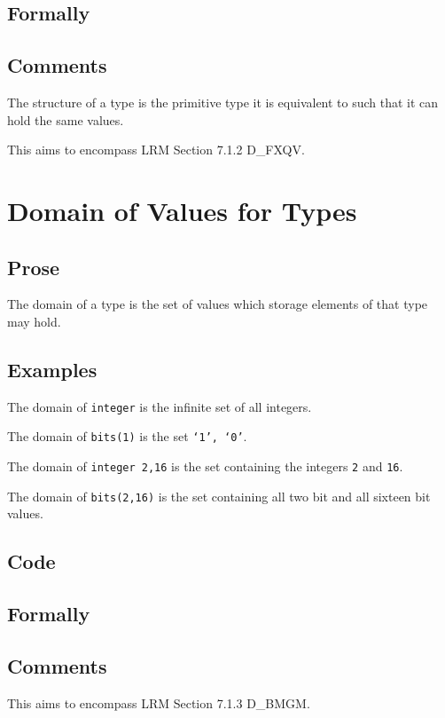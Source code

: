 \documentclass{book}
\begin{document}
    \subsection{Formally}

    \subsection{Comments}
    The structure of a type is the primitive type it is equivalent to such that
    it can hold the same values. 

    This aims to encompass LRM Section 7.1.2 D\_FXQV.

\section{Domain of Values for Types}

\subsection{Prose}
  The domain of a type is the set of values which storage elements of that type
may hold. 

\subsection{Examples}
  The domain of \texttt{integer} is the infinite set of all integers.

  The domain of \texttt{bits(1)} is the set \texttt{{‘1’, ‘0’}}.

  The domain of \texttt{integer {2,16}} is the set containing the integers \texttt{2} and \texttt{16}.

  The domain of \texttt{bits({2,16})} is the set containing all two bit and all sixteen bit values.

  \subsection{Code}

  \subsection{Formally}

  \subsection{Comments}
  This aims to encompass LRM Section 7.1.3 D\_BMGM.
\end{document}

